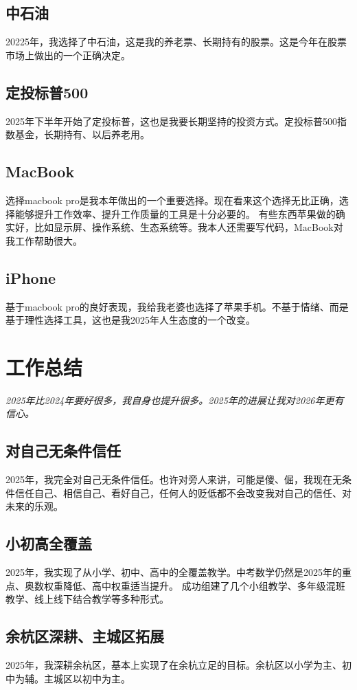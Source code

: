 \documentclass[11pt,a4paper]{article}
\begin{document}
\subsection{中石油}
20225年，我选择了中石油，这是我的养老票、长期持有的股票。这是今年在股票市场上做出的一个正确决定。
\subsection{定投标普500}
2025年下半年开始了定投标普，这也是我要长期坚持的投资方式。定投标普500指数基金，长期持有、以后养老用。
\subsection{MacBook}
选择macbook pro是我本年做出的一个重要选择。现在看来这个选择无比正确，选择能够提升工作效率、提升工作质量的工具是十分必要的。
有些东西苹果做的确实好，比如显示屏、操作系统、生态系统等。我本人还需要写代码，MacBook对我工作帮助很大。
\subsection{iPhone }
基于macbook pro的良好表现，我给我老婆也选择了苹果手机。不基于情绪、而是基于理性选择工具，这也是我2025年人生态度的一个改变。




%
\section{工作总结}
\label{sec:ExpAufb}
%
\textit{2025年比2024年要好很多，我自身也提升很多。2025年的进展让我对2026年更有信心。}\\
\subsection{对自己无条件信任}
2025年，我完全对自己无条件信任。也许对旁人来讲，可能是傻、倔，我现在无条件信任自己、相信自己、看好自己，任何人的贬低都不会改变我对自己的信任、对未来的乐观。
\subsection{小初高全覆盖}
2025年，我实现了从小学、初中、高中的全覆盖教学。中考数学仍然是2025年的重点、奥数权重降低、高中权重适当提升。
成功组建了几个小组教学、多年级混班教学、线上线下结合教学等多种形式。
\subsection{余杭区深耕、主城区拓展}
2025年，我深耕余杭区，基本上实现了在余杭立足的目标。余杭区以小学为主、初中为辅。主城区以初中为主。
\end{document}
